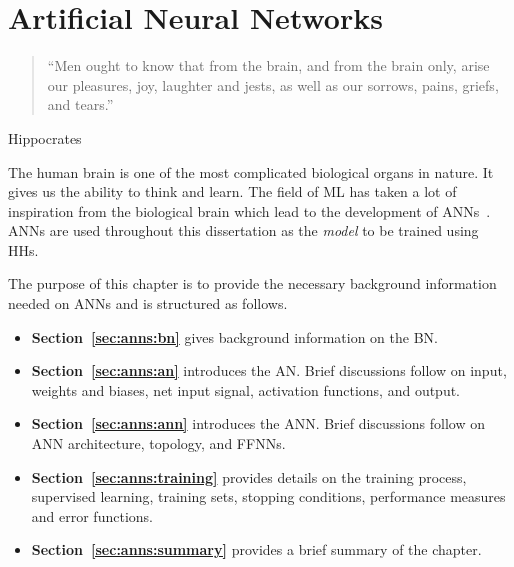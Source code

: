 \chapter{Artificial Neural Networks}
\label{chap:anns}

\begin{quotation}
      \noindent ``Men ought to know that from the brain, and from the brain only, arise our pleasures, joy, laughter and jests, as well as our sorrows, pains, griefs, and tears.''
\end{quotation}
\begin{flushright}
      Hippocrates
\end{flushright}

\noindent
The human brain is one of the most complicated biological organs in nature. It gives us the ability to think and learn. The field of \acs{ML} has taken a lot of inspiration from the biological brain which lead to the development of \acp{ANN}~\cite{ref:rosenblatt:1958}. \acp{ANN} are used throughout this dissertation as the \textit{model} to be trained using \acp{HH}.

The purpose of this chapter is to provide the necessary background information needed on \acp{ANN} and is structured as follows.

\begin{itemize}
      \item \textbf{Section~\ref{sec:anns:bn}} gives background information on the \acs{BN}.

      \item \textbf{Section~\ref{sec:anns:an}} introduces the \acs{AN}. Brief discussions follow on input, weights and biases, net input signal, activation functions, and output.

      \item \textbf{Section~\ref{sec:anns:ann}} introduces the \acs{ANN}. Brief discussions follow on \acs{ANN} architecture, topology, and \acp{FFNN}.

      \item \textbf{Section~\ref{sec:anns:training}} provides details on the training process, supervised learning, training sets, stopping conditions, performance measures and error functions.

      \item \textbf{Section~\ref{sec:anns:summary}} provides a brief summary of the chapter.
\end{itemize}



